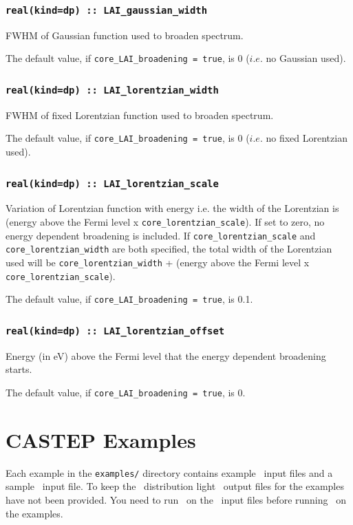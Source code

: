 \documentclass[a4paper,11pt,twoside]{book}
\begin{document}
{\subsection[core\_gaussian\_width]{\tt real(kind=dp) :: LAI\_gaussian\_width}
FWHM of Gaussian function used to broaden spectrum.

The default value, if \verb#core_LAI_broadening = true#, is 0 ($i.e.$ no Gaussian used).

\subsection[core\_lorentzian\_width]{\tt real(kind=dp) :: LAI\_lorentzian\_width}
FWHM of fixed Lorentzian function used to broaden spectrum.

The default value, if \verb#core_LAI_broadening = true#, is 0 ($i.e.$ no fixed Lorentzian used).

\subsection[core\_lorentzian\_scale]{\tt real(kind=dp) :: LAI\_lorentzian\_scale}
Variation of Lorentzian function with energy i.e. the width of the Lorentzian is (energy above the Fermi level x
\verb#core_lorentzian_scale#).  If set to zero, no energy dependent broadening is included.
If \verb#core_lorentzian_scale# and \verb#core_lorentzian_width# are both specified, the
total width of the Lorentzian used will be \verb#core_lorentzian_width# + (energy above the Fermi level x
\verb#core_lorentzian_scale#).

The default value, if \verb#core_LAI_broadening = true#, is 0.1.

\subsection[core\_lorentzian\_offset]{\tt real(kind=dp) :: LAI\_lorentzian\_offset}
Energy (in eV) above the Fermi level that the energy dependent broadening starts.

The default value, if \verb#core_LAI_broadening = true#, is 0.


\chapter{CASTEP Examples}

Each example in the \verb#examples/# directory contains example \castep\ input files and a sample \optados\ input file. To keep the \optados\ distribution light \castep\ output files for the examples have not been provided. You need to run \castep\ on the \castep\ input files before running \optados\ on the examples.

}
\end{document}
